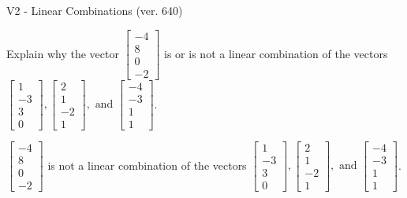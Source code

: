 \begin{exercise}
  \begin{exerciseTitle}V2 - Linear Combinations (ver. 640)\end{exerciseTitle}
  \begin{exerciseStatement}
    Explain why the vector \(\left[\begin{array}{c}
-4 \\
8 \\
0 \\
-2
\end{array}\right]\)  is or is not a linear 
	combination of the vectors \(\left[\begin{array}{c}
1 \\
-3 \\
3 \\
0
\end{array}\right] , \left[\begin{array}{c}
2 \\
1 \\
-2 \\
1
\end{array}\right] , \text{ and } \left[\begin{array}{c}
-4 \\
-3 \\
1 \\
1
\end{array}\right]\).
	


  \end{exerciseStatement}
  \begin{exerciseAnswer}
   \(\left[\begin{array}{c}
-4 \\
8 \\
0 \\
-2
\end{array}\right]\) 
  	 is not  
	a linear combination of the vectors \(\left[\begin{array}{c}
1 \\
-3 \\
3 \\
0
\end{array}\right] , \left[\begin{array}{c}
2 \\
1 \\
-2 \\
1
\end{array}\right] , \text{ and } \left[\begin{array}{c}
-4 \\
-3 \\
1 \\
1
\end{array}\right]\).

	
  


  \end{exerciseAnswer}
\end{exercise}